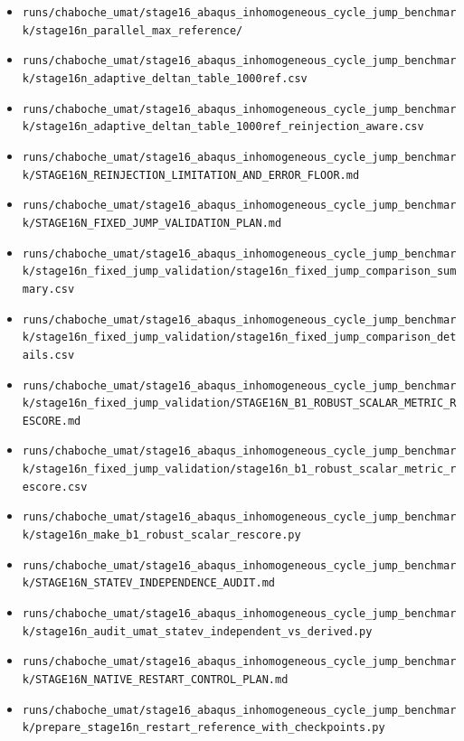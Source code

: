 \documentclass[11pt,a4paper]{article}
\newcommand{\code}[1]{\texttt{#1}}
\begin{document}
\begin{itemize}
  \item \code{runs/chaboche\_umat/stage16\_abaqus\_inhomogeneous\_cycle\_jump\_benchmark/stage16n\_parallel\_max\_reference/}
  \item \code{runs/chaboche\_umat/stage16\_abaqus\_inhomogeneous\_cycle\_jump\_benchmark/stage16n\_adaptive\_deltan\_table\_1000ref.csv}
  \item \code{runs/chaboche\_umat/stage16\_abaqus\_inhomogeneous\_cycle\_jump\_benchmark/stage16n\_adaptive\_deltan\_table\_1000ref\_reinjection\_aware.csv}
  \item \code{runs/chaboche\_umat/stage16\_abaqus\_inhomogeneous\_cycle\_jump\_benchmark/STAGE16N\_REINJECTION\_LIMITATION\_AND\_ERROR\_FLOOR.md}
  \item \code{runs/chaboche\_umat/stage16\_abaqus\_inhomogeneous\_cycle\_jump\_benchmark/STAGE16N\_FIXED\_JUMP\_VALIDATION\_PLAN.md}
  \item \code{runs/chaboche\_umat/stage16\_abaqus\_inhomogeneous\_cycle\_jump\_benchmark/stage16n\_fixed\_jump\_validation/stage16n\_fixed\_jump\_comparison\_summary.csv}
  \item \code{runs/chaboche\_umat/stage16\_abaqus\_inhomogeneous\_cycle\_jump\_benchmark/stage16n\_fixed\_jump\_validation/stage16n\_fixed\_jump\_comparison\_details.csv}
  \item \code{runs/chaboche\_umat/stage16\_abaqus\_inhomogeneous\_cycle\_jump\_benchmark/stage16n\_fixed\_jump\_validation/STAGE16N\_B1\_ROBUST\_SCALAR\_METRIC\_RESCORE.md}
  \item \code{runs/chaboche\_umat/stage16\_abaqus\_inhomogeneous\_cycle\_jump\_benchmark/stage16n\_fixed\_jump\_validation/stage16n\_b1\_robust\_scalar\_metric\_rescore.csv}
  \item \code{runs/chaboche\_umat/stage16\_abaqus\_inhomogeneous\_cycle\_jump\_benchmark/stage16n\_make\_b1\_robust\_scalar\_rescore.py}
  \item \code{runs/chaboche\_umat/stage16\_abaqus\_inhomogeneous\_cycle\_jump\_benchmark/STAGE16N\_STATEV\_INDEPENDENCE\_AUDIT.md}
  \item \code{runs/chaboche\_umat/stage16\_abaqus\_inhomogeneous\_cycle\_jump\_benchmark/stage16n\_audit\_umat\_statev\_independent\_vs\_derived.py}
  \item \code{runs/chaboche\_umat/stage16\_abaqus\_inhomogeneous\_cycle\_jump\_benchmark/STAGE16N\_NATIVE\_RESTART\_CONTROL\_PLAN.md}
  \item \code{runs/chaboche\_umat/stage16\_abaqus\_inhomogeneous\_cycle\_jump\_benchmark/prepare\_stage16n\_restart\_reference\_with\_checkpoints.py}

\end{itemize}
\end{document}
